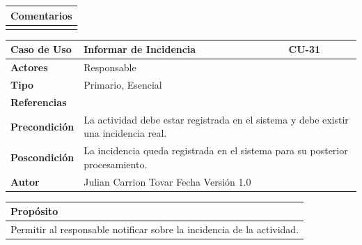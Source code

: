 \begin{table}[h!]
\centering
\begin{tabularx}{\textwidth}{|X|}
\hline
\cellcolor[HTML]{F2F2F2}\textbf{Comentarios} \\ \hline
\\ %
\hline
\end{tabularx}
\end{table}




\clearpage

\begin{table}[h!]
\centering
\begin{tabularx}{\textwidth}{|p{3cm}|p{8cm}|p{2cm}|}
\hline
\textbf{Caso de Uso} & Informar de Incidencia & CU-31 \\ \hline
\textbf{Actores} & \multicolumn{2}{p{12cm}|}{Responsable} \\ \hline
\textbf{Tipo} & \multicolumn{2}{p{12cm}|}{Primario, Esencial} \\ \hline
\textbf{Referencias} & \multicolumn{2}{p{12cm}|}{} \\ \hline
\textbf{Precondición} & \multicolumn{2}{p{12cm}|}{La actividad debe estar registrada en el sistema y debe existir una incidencia real.} \\ \hline
\textbf{Poscondición} & \multicolumn{2}{p{12cm}|}{La incidencia queda registrada en el sistema para su posterior procesamiento.} \\ \hline

\textbf{Autor} & \multicolumn{2}{p{10cm}|}{Julian Carrion Tovar \hfill Fecha \hfill Versión 1.0} \\ \hline
\end{tabularx}
\end{table}


\vspace{0.2cm}

\begin{table}[h!]
\centering
\begin{tabularx}{\textwidth}{|X|}
\hline
\cellcolor[HTML]{F2F2F2}\textbf{Propósito} \\ \hline
Permitir al responsable notificar sobre la incidencia de la actividad. \\ \hline
\end{tabularx}
\end{table}

\vspace{0.2cm}

